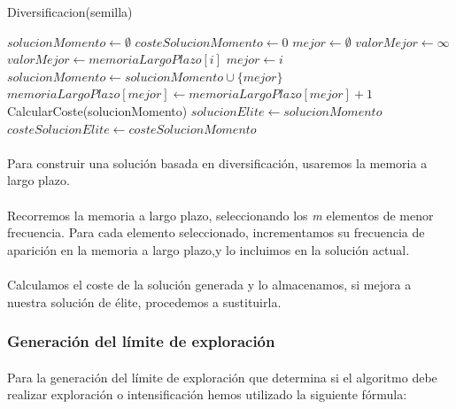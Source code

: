 \documentclass{article}
\begin{document}
	\begin{algorithm}[H]
		\caption{Diversificacion(semilla)}
		\begin{algorithmic}
			\STATE $solucionMomento \leftarrow \emptyset$
			\STATE $costeSolucionMomento \leftarrow 0$
			\STATE $mejor \leftarrow \emptyset$
			\STATE $valorMejor \leftarrow \infty$
			\STATE $valorMejor \leftarrow memoriaLargoPlazo[i]$
			\STATE $mejor \leftarrow i$
			\ENDIF
			\ENDFOR
			\STATE $solucionMomento \leftarrow solucionMomento \cup \{mejor\}$
			\STATE $memoriaLargoPlazo[mejor] \leftarrow memoriaLargoPlazo[mejor]+1$
			\ENDWHILE
			\STATE CalcularCoste(solucionMomento)
			\STATE $solucionElite \leftarrow solucionMomento$
			\STATE $costeSolucionElite \leftarrow costeSolucionMomento$
			\ENDIF
		\end{algorithmic}
	\end{algorithm}
	
	\paragraph{}Para construir una solución basada en diversificación, usaremos la memoria a largo plazo.
	
	\paragraph{}Recorremos la memoria a largo plazo, seleccionando los \emph{m} elementos de menor frecuencia. Para cada elemento seleccionado, incrementamos su frecuencia de aparición en la memoria a largo plazo,y lo incluimos en la solución actual.
	
	\paragraph{}Calculamos el coste de la solución generada y lo almacenamos, si mejora a nuestra solución de élite, procedemos a sustituirla. 
	
	\subsubsection{Generación del límite de exploración}
	
	\paragraph{}Para la generación del límite de exploración que determina si el algoritmo debe realizar exploración o intensificación hemos utilizado la siguiente fórmula:
	
\end{document}
